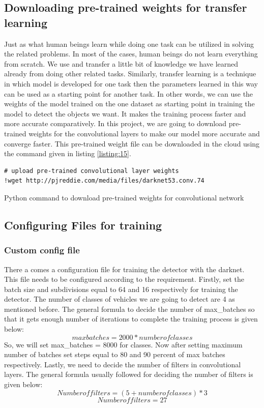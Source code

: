 \subsection{Downloading pre-trained weights for transfer learning}
Just as what human beings learn while doing one task can be utilized in solving the related problems. In most of the cases, human beings do not learn everything from scratch. We use and transfer a little bit of knowledge we have learned already from doing other related tasks. Similarly, transfer learning is a technique in which model is developed for one task then the parameters learned in this way can be used as a starting point for another task. In other words, we can use the weights of the model trained on the one dataset as starting point in training the model to detect the objects we want. It makes the training process faster and more accurate comparatively. In this project, we are going to download pre-trained weights for the convolutional layers to make our model more accurate and converge faster. This pre-trained weight file can be downloaded in the cloud using the command given in listing \ref{listing:15}.
\begin{longlisting}
\begin{verbatim}
# upload pre-trained convolutional layer weights
!wget http://pjreddie.com/media/files/darknet53.conv.74
\end{verbatim}
\caption{Python command to download pre-trained weights for convolutional network}
\label{listing:15}
\end{longlisting}
\subsection{Configuring Files for training}
\subsubsection*{Custom config file}
There a comes a configuration file for training the detector with the darknet. This file needs to be configured according to the requirement. Firstly, set the batch size and subdivisions equal to 64 and 16 respectively for training the detector. The number of classes of vehicles we are going to detect are 4 as mentioned before. The general formula to decide the number of max\_batches so that it gets enough number of iterations to complete the training process is given below:
\begin{equation} 
max batches = 2000 * number of classes
\end{equation}
So, we will set max\_batches = 8000 for classes. Now after setting maximum number of batches set steps equal to 80 and 90 percent of max batches respectively. Lastly, we need to decide the number of filters in convolutional layers. The general formula usually followed for deciding the number of filters is given below:
\begin{equation} 
Number of filters = (5 + number of classes) *3
\end{equation}
\begin{equation*} 
Number of filters= 27
\end{equation*}
